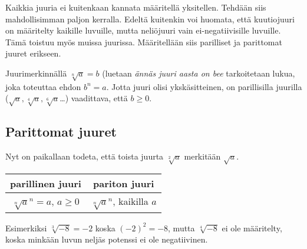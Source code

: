 Kaikkia juuria ei kuitenkaan kannata määritellä yksitellen. Tehdään siis mahdollisimman paljon kerralla. Edeltä kuitenkin voi huomata, että kuutiojuuri on määritelty kaikille luvuille, mutta neliöjuuri vain ei-negatiivisille luvuille. Tämä toistuu myös muissa juurissa. Määritellään siis parilliset ja parittomat juuret erikseen.

Juurimerkinnällä $\sqrt[n]{a}=b$ (luetaan \emph{ännäs juuri aasta on bee} tarkoitetaan lukua, joka toteuttaa ehdon $b^n = a$. Jotta juuri olisi ykskäsitteinen, on parillisilla juurilla ($\sqrt{a}, \sqrt[4]{a}, \sqrt[6]{a}$\ldots) vaadittava, että $b\ge0$.



\subsection{Parittomat juuret}

Nyt on paikallaan todeta, että toista juurta $\sqrt[2]{a}$ merkitään $\sqrt{a}$.

\begin{tabular}{c|c}
parillinen juuri & pariton juuri\\
\hline
$\sqrt[n]{a}^n=a$, $a\ge0$ & $\sqrt[n]{a}^n$, kaikilla $a$
\end{tabular}

Esimerkiksi $\sqrt[3]{-8}=-2$ koska $(-2)^2=-8$, mutta $\sqrt[4]{-8}$ ei ole määritelty, koska minkään luvun neljäs potenssi ei ole negatiivinen.

%

